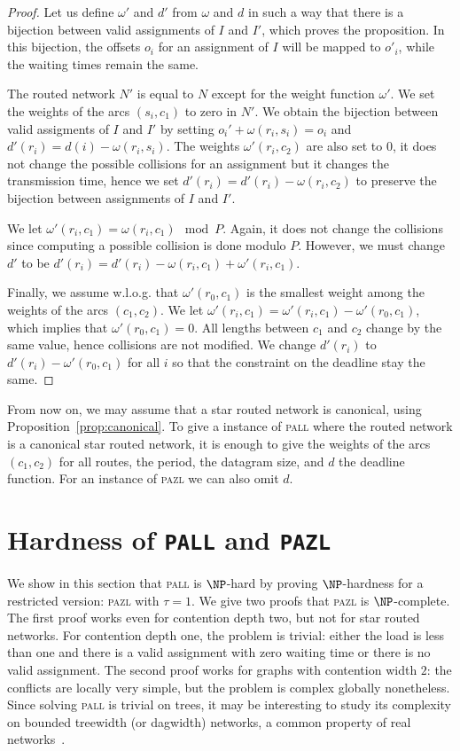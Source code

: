 \documentclass[a4paper,10pt]{article}
\newcommand\pazl{\textsc{pazl}\xspace}
\newcommand\pall{\textsc{pall}\xspace}
\begin{document}
  \begin{proof}
  Let us define $\omega'$ and $d'$ from $\omega$ and $d$ in such a way that there is a bijection 
   between valid assignments of $I$ and $I'$, which proves the proposition. In this bijection,
   the offsets $o_i$ for an assignment of $I$ will be mapped to $o'_i$, while the waiting times remain the same.
  
  The routed network $N'$ is equal to $N$ except for the weight function $\omega'$.
  We set the weights of the arcs $(s_i,c_1)$ to zero in $N'$. We obtain the bijection between valid assigments of $I$ and $I'$ by setting $o_i' + \omega(r_i,s_i) = o_i $ and $d'(r_i) = d(i) - \omega(r_i,s_i)$. The weights $\omega'(r_i,c_2)$ are also set to $0$, it does not change the possible collisions
  for an assignment but it changes the transmission time, hence we set $d'(r_i) = d'(r_i) - \omega(r_i,c_2)$
  to preserve the bijection between assignments of $I$ and $I'$. 

  We let $\omega'(r_i,c_1) = \omega(r_i,c_1) \mod P$. Again, it does not change the collisions since computing a possible collision is done modulo $P$. However, we must change $d'$ to be $d'(r_i) = d'(r_i) - \omega(r_i,c_1) + \omega'(r_i,c_1)$.

  Finally, we assume w.l.o.g. that $\omega'(r_0,c_1)$ is the smallest weight among the weights of the arcs
  $(c_1,c_2)$. We let $\omega'(r_i,c_1) = \omega'(r_i,c_1) - \omega'(r_0,c_1)$, which implies that $\omega'(r_0,c_1) = 0$.  All lengths between $c_1$ and $c_2$ change by the same value, hence collisions are not modified. We change $d'(r_i)$ to  $d'(r_i) - \omega'(r_0,c_1)$ for all $i$ so that the constraint on the deadline stay the same.
  \end{proof}

   From now on, we may assume that a star routed network is canonical, using Proposition~\ref{prop:canonical}. To give a instance of \pall where the routed network is a canonical star routed network, it is enough to give the weights of the arcs $(c_1,c_2)$ for all routes, the period, the datagram size, and $d$ the deadline function. For an instance of \pazl we can also omit $d$.


\section{Hardness of \texttt{PALL} and \texttt{PAZL}}
  \label{sec:complexity}


	We show in this section that \pall is $\NP$-hard by proving $\NP$-hardness for a restricted version: \pazl with $\tau = 1$. We give two proofs that \pazl is $\NP$-complete.
	The first proof works even for contention depth two, but not for star routed networks.
	 For contention depth one, the problem is trivial: either the load is less than one and there is a valid assignment with zero waiting time or there is no valid assignment. 
	 The second proof works for graphs with contention width $2$: the conflicts are locally very simple, but the problem is complex globally nonetheless. Since solving \pall is trivial on trees, it may be interesting to study its complexity on bounded treewidth (or dagwidth) networks, a common property of real networks~\cite{de2011treewidth}.
 
\end{document}

